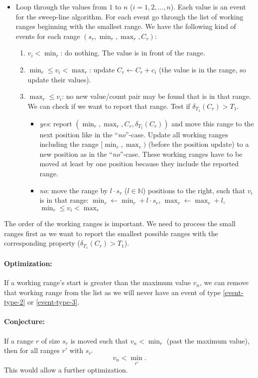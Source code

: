 \documentclass[english,a4paper]{article}
\begin{document}
\begin{description}
\begin{itemize}
      \item Loop through the values from $1$ to $n$ ($i=1,2,\ldots,n$).  Each value is an event for the
      sweep-line algorithm.  For each event go through the list of working ranges beginning with the smallest
      range.  We have the following kind of events for each range $(s_r, \min_r, \max_r, C_r)$:
      \begin{enumerate}
        \item \label{event-type-1}$v_i<\min_r$:  do nothing.  The value is in front of the range.
        \item \label{event-type-2}$\min_r\le v_i<\max_r$:  update $C_r\leftarrow C_r + c_i$ (the value is in
          the range, so update their values).
        \item \label{event-type-3}$\max_r\le v_i$:  no new value/count pair may be found that is in that
          range.  We can check if we want to report that range.  Test if $\delta_{T_1}(C_r)>T_1$.
          \begin{itemize}
            \item \emph{yes}:  report $(\min_r,\max_r,C_r,\delta_{T_1}(C_r))$ and move this range to the next
              position like in the ``\emph{no}''-case.  Update all working ranges including the range
              $[\min_r,\max_r)$ (before the position update) to a new position as in the ``\emph{no}''-case.
              These working ranges have to be moved at least by one position because they include the reported
              range.
            \item \emph{no}:  move the range by $l\cdot s_r$ ($l\in\mathds{N}$) positions to the right, such
              that $v_i$ is in that range: $\min_r\leftarrow\min_r+l\cdot s_r$, $\max_r\leftarrow\max_r+l$,
              $\min_r\le v_i<\max_r$
          \end{itemize}
      \end{enumerate}
    \end{itemize}
  \end{description}

  The order of the working ranges is important.  We need to process the small ranges first as we want to
  report the smallest possible ranges with the corresponding property ($\delta_{T_1}(C_r)>T_1$).
  
  \paragraph*{Optimization:}
  If a working range's start is greater than the maximum value $v_n$, we can remove that working range from
  the list as we will never have an event of type \ref{event-type-2} or \ref{event-type-3}.

  \paragraph*{Conjecture:}
  If a range $r$ of size $s_r$ is moved such that $v_n<\min_r$ (past the maximum value), then for all ranges
  $r'$ with $s_{r'}$
  $$
    v_n<\min_{r'}.
  $$
  This would allow a further optimization.
\end{document}
